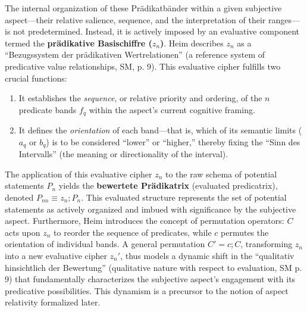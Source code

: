 \documentclass[
    12pt,              %
    a4paper,           %
    headings=normal,   %
    twoside=true,      %
    BCOR=8mm,          %
]{scrbook}
\newcommand{\q}[1]{\enquote{#1}}
\newcommand{\pradikatrix}{P_n}
\begin{document}
The internal organization of these Prädikatbänder within a given subjective aspect—their relative salience, sequence, and the interpretation of their ranges—is not predetermined. Instead, it is actively imposed by an evaluative component termed the \textbf{prädikative Basischiffre (\(z_n\))}. Heim describes \(z_n\) as a \q{Bezugssystem der prädikativen Wertrelationen} (a reference system of predicative value relationships, SM, p. 9). This evaluative cipher fulfills two crucial functions:
\begin{enumerate}
    \item  It establishes the \textit{sequence}, or relative priority and ordering, of the \(n\) predicate bands \(f_q\) within the aspect's current cognitive framing.
    \item  It defines the \textit{orientation} of each band—that is, which of its semantic limits (\(a_q\) or \(b_q\)) is to be considered \q{lower} or \q{higher,} thereby fixing the \q{Sinn des Intervalls} (the meaning or directionality of the interval).
\end{enumerate}
The application of this evaluative cipher \(z_n\) to the raw schema of potential statements \(\pradikatrix\) yields the \textbf{bewertete Prädikatrix} (evaluated predicatrix), denoted \(P_{nn} \equiv z_n; P_n\). This evaluated structure represents the set of potential statements as actively organized and imbued with significance by the subjective aspect. Furthermore, Heim introduces the concept of permutation operators: \(C\) acts upon \(z_n\) to reorder the sequence of predicates, while \(c\) permutes the orientation of individual bands. A general permutation \(C' = c;C\), transforming \(z_n\) into a new evaluative cipher \(z_n'\), thus models a dynamic shift in the \q{qualitativ hinsichtlich der Bewertung} (qualitative nature with respect to evaluation, SM p. 9) that fundamentally characterizes the subjective aspect's engagement with its predicative possibilities. This dynamism is a precursor to the notion of aspect relativity formalized later.
\end{document}
